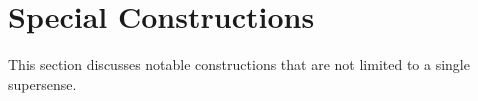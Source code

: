 \section{Special Constructions}\label{sec:cxns}

This section discusses notable constructions that are not limited to a single supersense.

